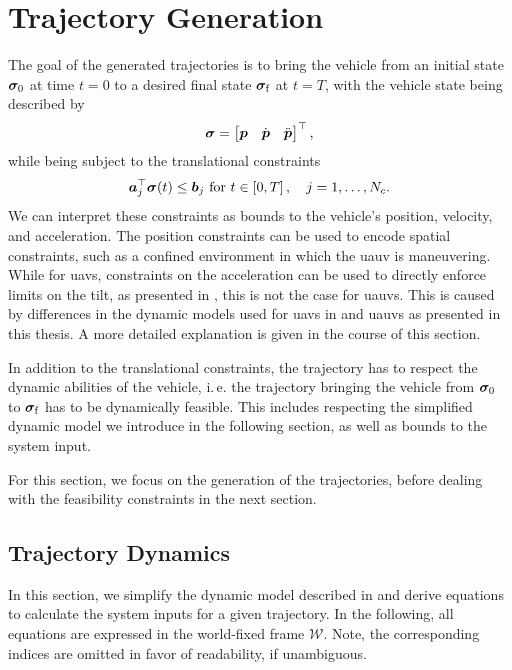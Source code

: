 \section{Trajectory Generation}
\label{sec:trajectory-generation}
The goal of the generated trajectories is to bring the vehicle from an initial state $\bm{\sigma}_0$ at time $t=0$ to a desired final state $\bm{\sigma}_{\text{f}}$ at $t=T$, with the vehicle state being described by 
\begin{equation}
	\bm{\sigma} = 
	\begin{bmatrix}
		\mbox{$\bm{p}$} & \mbox{$\dot{\bm{p}}$} & \mbox{$\ddot{\bm{p}}$}
	\end{bmatrix}^\top
	,
\end{equation}
while being subject to the translational constraints
\begin{equation}
	\label{eq:translational-constraints}
	\mbox{$\bm{a}$}_j^\top \bm{\sigma}(t) \leq \mbox{$\bm{b}$}_j
	\text{ for }
	t \in \left[0,T\right],
	\quad
	j=1,\dots,N_c
	.
\end{equation}
We can interpret these constraints as bounds to the vehicle's position, velocity, and acceleration. The position constraints can be used to encode spatial constraints, such as a confined environment in which the \ac{uauv} is maneuvering. While for \acp{uav}, constraints on the acceleration can be used to directly enforce limits on the tilt, as presented in \cite{MuellerHehn15}, this is not the case for \acp{uauv}. This is caused by differences in the dynamic models used for \acp{uav} in \cite{MuellerHehn15} and \acp{uauv} as presented in this thesis. A more detailed explanation is given in the course of this section.

In addition to the translational constraints, the trajectory has to respect the dynamic abilities of the vehicle, i.\,e. the trajectory bringing the vehicle from $\bm{\sigma}_0$ to $\bm{\sigma}_\text{f}$ has to be dynamically feasible. This includes respecting the simplified dynamic model we introduce in the following section, as well as bounds to the system input.

For this section, we focus on the generation of the trajectories, before dealing with the feasibility constraints in the next section.

\subsection{Trajectory Dynamics}
\label{sec:trajectory-dynamics}
In this section, we simplify the dynamic model described in  and derive equations to calculate the system inputs for a given trajectory. In the following, all equations are expressed in the world-fixed frame $\mathcal{W}$.
Note, the corresponding indices are omitted in favor of readability, if unambiguous.

